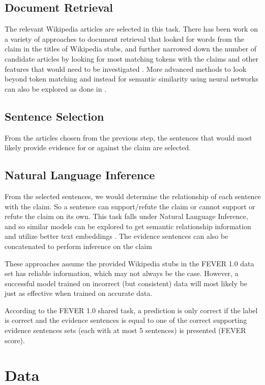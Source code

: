 \documentclass[11pt,a4paper]{article}
\begin{document}
\subsection{Document Retrieval}
The relevant Wikipedia articles are selected in this task. There has been work on a variety of approaches to document retrieval that looked for words from the claim in the titles of Wikipedia stubs, and further narrowed down the number of candidate articles by looking for most matching tokens with the claims and other features that would need to be investigated \cite{ucl2018}. More advanced methods to look beyond token matching and instead for semantic similarity using neural networks can also be explored as done in \cite{unc2018}.

\subsection{Sentence Selection}
From the articles chosen from the previous step, the sentences that would most likely provide evidence for or against the claim are selected.

\subsection{Natural Language Inference}
From the selected sentences, we would determine the relationship of each sentence with the claim. So a sentence can support/refute the claim or cannot support or refute the claim on its own. This task falls under Natural Language Inference, and so similar models can be explored to get semantic relationship information and utilize better text embeddings \cite{ucl2018}. The evidence sentences can also be concatenated to perform inference on the claim \cite{unc2018}

These approaches assume the provided Wikipedia stubs in the FEVER 1.0 data set has reliable information, which may not always be the case. However, a successful model trained on incorrect (but consistent) data will most likely be just as effective when trained on accurate data.

According to the FEVER 1.0 shared task, a prediction is only correct if the label is correct and the evidence sentences is equal to one of the correct supporting evidence sentences sets (each with at most 5 sentences) is presented (FEVER score).


\section{Data}
\end{document}
